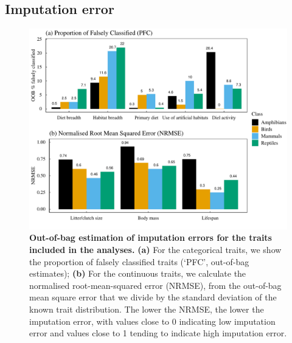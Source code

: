 \documentclass[11pt]{article}
\begin{document}


\subsection{Imputation error}

\begin{figure}[h!]
\centering
\includegraphics[scale=0.7]{Figures/Imputation_errors}
\caption[Out-of-bag estimation of imputation errors for the traits included in the analyses]{\textbf{Out-of-bag estimation of imputation errors for the traits included in the analyses.} \textbf{(a)} For the categorical traits, we show the proportion of falsely classified traits (`PFC', out-of-bag estimates); \textbf{(b)} For the continuous traits, we calculate the normalised root-mean-squared error (NRMSE), from the out-of-bag mean square error that we divide by the standard deviation of the known trait distribution. The lower the NRMSE, the lower the imputation error, with values close to 0 indicating low imputation error and values close to 1 tending to indicate high imputation error.} 
\label{SI_4_Figure2}
\end{figure}

\end{document}
